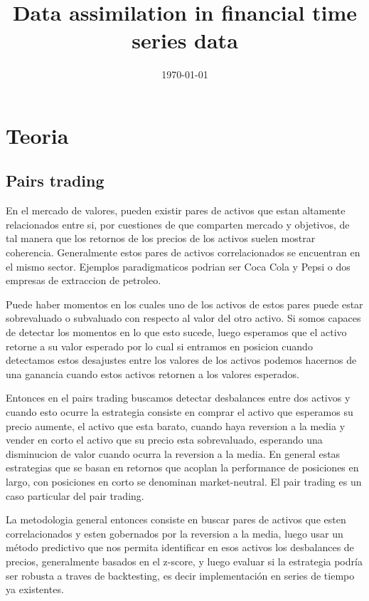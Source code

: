 \documentclass{myarticle}
\date{\today}
\title{Data assimilation in financial time series data}
\begin{document}
\maketitle

\section{Teoria}
\label{sec:org2dc5380}

\subsection{Pairs trading}
\label{sec:org6eea304}

En el mercado de valores, pueden existir pares de activos que estan altamente relacionados entre si, por cuestiones de que comparten mercado y objetivos, de tal manera que los retornos de los precios de los activos suelen mostrar coherencia. Generalmente estos pares de activos correlacionados se encuentran en el mismo sector.  Ejemplos paradigmaticos podrian ser Coca Cola y Pepsi o dos empresas de extraccion de petroleo.

Puede haber momentos en los cuales uno de los activos de estos pares puede estar sobrevaluado o subvaluado con respecto al valor del otro activo. Si somos capaces de detectar los momentos en lo que esto sucede, luego esperamos que el activo retorne a su valor esperado por lo cual si entramos en posicion cuando detectamos estos  desajustes entre los valores de los activos podemos hacernos de una ganancia cuando estos activos retornen a los valores esperados.


Entonces en el pairs trading buscamos detectar desbalances entre dos activos  y cuando esto ocurre la estrategia consiste en comprar el activo que esperamos su precio aumente, el activo que esta barato, cuando haya reversion a la media y vender en corto el activo que su precio esta sobrevaluado, esperando una disminucion de valor cuando ocurra la reversion a la media. En general estas estrategias que se basan en retornos que acoplan la performance de posiciones en largo, con posiciones en corto se denominan market-neutral. El pair trading es un caso particular del pair trading.

La metodologia general entonces consiste en buscar pares de activos que esten correlacionados  y esten gobernados por la reversion a la media, luego usar un m\'etodo predictivo que nos permita identificar en esos activos los desbalances de precios, generalmente basados en el z-score, y luego evaluar si la estrategia podr\'ia ser robusta a traves de backtesting, es decir implementaci\'on en series de tiempo ya existentes.
\end{document}
